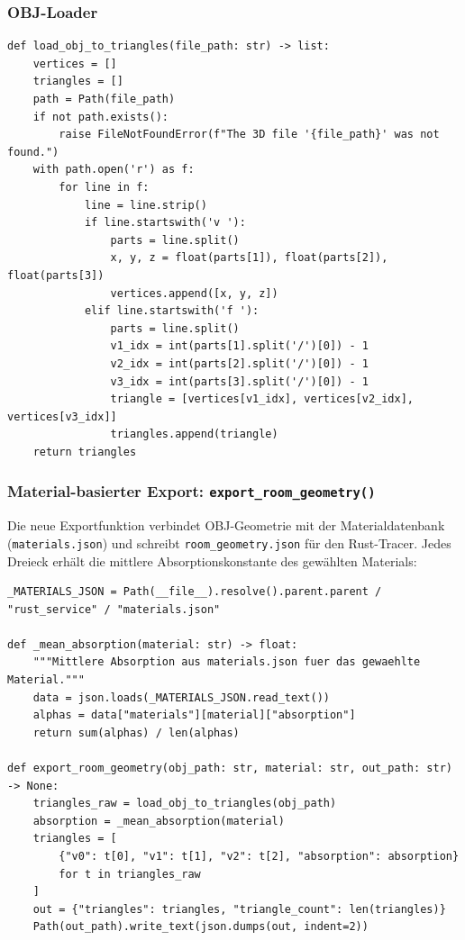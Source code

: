 \subsubsection{OBJ-Loader}

\begin{lstlisting}
def load_obj_to_triangles(file_path: str) -> list:
    vertices = []
    triangles = []
    path = Path(file_path)
    if not path.exists():
        raise FileNotFoundError(f"The 3D file '{file_path}' was not found.")
    with path.open('r') as f:
        for line in f:
            line = line.strip()
            if line.startswith('v '):
                parts = line.split()
                x, y, z = float(parts[1]), float(parts[2]), float(parts[3])
                vertices.append([x, y, z])
            elif line.startswith('f '):
                parts = line.split()
                v1_idx = int(parts[1].split('/')[0]) - 1
                v2_idx = int(parts[2].split('/')[0]) - 1
                v3_idx = int(parts[3].split('/')[0]) - 1
                triangle = [vertices[v1_idx], vertices[v2_idx], vertices[v3_idx]]
                triangles.append(triangle)
    return triangles
\end{lstlisting}

\subsubsection{Material-basierter Export: \texttt{export\_room\_geometry()}}

Die neue Exportfunktion verbindet OBJ-Geometrie mit der Materialdatenbank
(\texttt{materials.json}) und schreibt \texttt{room\_geometry.json} f\"ur den Rust-Tracer.
Jedes Dreieck erh\"alt die mittlere Absorptionskonstante des gew\"ahlten Materials:

\begin{lstlisting}
_MATERIALS_JSON = Path(__file__).resolve().parent.parent / "rust_service" / "materials.json"

def _mean_absorption(material: str) -> float:
    """Mittlere Absorption aus materials.json fuer das gewaehlte Material."""
    data = json.loads(_MATERIALS_JSON.read_text())
    alphas = data["materials"][material]["absorption"]
    return sum(alphas) / len(alphas)

def export_room_geometry(obj_path: str, material: str, out_path: str) -> None:
    triangles_raw = load_obj_to_triangles(obj_path)
    absorption = _mean_absorption(material)
    triangles = [
        {"v0": t[0], "v1": t[1], "v2": t[2], "absorption": absorption}
        for t in triangles_raw
    ]
    out = {"triangles": triangles, "triangle_count": len(triangles)}
    Path(out_path).write_text(json.dumps(out, indent=2))
\end{lstlisting}

